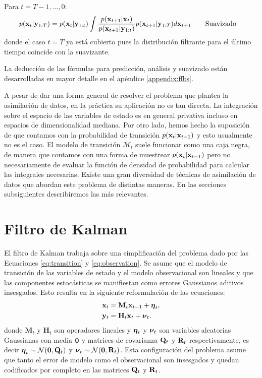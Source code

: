Para $t = T-1, ..., 0$:
\begin{align}
    p(\mathbf{x}_t | \mathbf{y}_{1:T}) = p(\mathbf{x}_t |\mathbf{y}_{1:t}) \int \frac{p(\mathbf{x}_{t+1} | \mathbf{x}_t)}
    {p(\mathbf{x}_{t+1} |\mathbf{y}_{1:t})}
    p(\mathbf{x}_{t+1} | \mathbf{y}_{1:T}) d\mathbf{x}_{t+1} \hspace{2em} &\text{Suavizado}
\end{align}
donde el caso $t = T$ ya está cubierto pues la distribución filtrante para el último tiempo coincide con la suavizante.

La deducción de las fórmulas para predicción, análisis y suavizado están desarrolladas en mayor detalle en el apéndice \ref{appendix:ffbs}.

A pesar de dar una forma general de resolver el problema que plantea la asimilación de datos, en la práctica su aplicación no es tan directa. La integración sobre el espacio de las variables de estado es en general privativa incluso en espacios de dimensionalidad mediana. Por otro lado, hemos hecho la suposición de que contamos con la probabilidad de transición $p(\mathbf{x}_t | \mathbf{x}_{t-1})$ y esto usualmente no es el caso. El modelo de transición $\mathcal{M}_t$ suele funcionar como una caja negra, de manera que contamos con una forma de muestrear $p(\mathbf{x}_t | \mathbf{x}_{t-1})$ pero no necesariamente de evaluar la función de densidad de probabilidad para calcular las integrales necesarias. Existe una gran diversidad de técnicas de asimilación de datos que abordan este problema de distintas maneras. En las secciones subsiguientes describiremos las más relevantes.

\section{Filtro de Kalman}\label{sec:kf}

El filtro de Kalman trabaja sobre una simplificación del problema dado por las Ecuaciones \ref{eq:transition} y \ref{eq:observation}. Se asume que el modelo de transición de las variables de estado y el modelo observacional son lineales y que las componentes estocásticas se manifiestan como errores Gaussianos aditivos insesgados. Esto resulta en la siguiente reformulación de las ecuaciones:
\begin{align}
    \mathbf{x}_t &= \mathbf{M}_t \mathbf{x}_{t-1} + \mbox{\boldmath$ \eta $}_t, \label{eq:kf_forward}\\
    \mathbf{y}_t &= \mathbf{H}_t \mathbf{x}_t + \mbox{\boldmath$ \nu $}_t. \label{eq:kf_observational}
\end{align}
donde $\mathbf{M}_t$ y $\mathbf{H}_t$ son operadores lineales y $\mbox{\boldmath$ \eta $}_t$ y $\mbox{\boldmath$ \nu $}_t$ son variables aleatorias Gaussianas con media $\mathbf{0}$ y matrices de covarianza $\mathbf{Q}_t$ y $\mathbf{R}_t$ respectivamente, es decir $\mbox{\boldmath$ \eta $}_t \sim \mathcal{N}(\mathbf{0}, \mathbf{Q}_t)$ y $\mbox{\boldmath$ \nu $}_t \sim \mathcal{N}(\mathbf{0}, \mathbf{R}_t)$. Esta configuración del problema asume que tanto el error de modelo como el observacional son insesgados y quedan codificados por completo en las matrices $\mathbf{Q}_t$ y $\mathbf{R}_t$.

